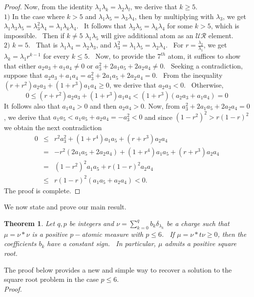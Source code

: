 \documentclass[12pt]{amsart}
\newtheorem{thm}{Theorem}[section]
\begin{document}
\begin{proof}
Now, from the identity $\lambda_1\lambda_k=\lambda_2\lambda_l$, we derive that $k\ge 5$.\\
$1)$ In the case where $k>5$ and  $\lambda_1\lambda_5=\lambda_3\lambda_4$, then by multiplying with $\lambda_3$, we get  
$ \lambda_1\lambda_3\lambda_5=\lambda_3^2\lambda_4=\lambda_1\lambda_k\lambda_4$. \ It follows that  $ \lambda_3\lambda_5=\lambda_k\lambda_4$ for some  $k> 5$, which is impossible. \ Then if $k\ne 5$ $\lambda_1\lambda_5$ will give additional atom as an $\mathcal{UR}$ element. \\
$2)$ $k=5$. \ That is $\lambda_1\lambda_4=\lambda_2\lambda_3$, and
$\lambda_3^2=\lambda_1\lambda_5=\lambda_2\lambda_4$. \ For $r=\frac{\lambda_2}{\lambda_1}$, we get $\lambda_k=\lambda_1r^{k-1}$ for every $k\le 5$. \ Now, to provide the $7^{th}$ atom, it suffices to show that either    $ a_2a_3+a_1a_4\ne 0$ or $a_3^2+2a_1a_5+2a_2a_4\ne 0$. \ Seeking a contradiction, suppose that  $ a_2a_3+a_1a_4=a_3^2+2a_1a_5+2a_2a_4= 0$. \ From the inequality $ (r+r^2)a_2a_3+(1+r^3) a_1a_4\ge 0$, we derive that $a_2a_3<0$. \ Otherwise,
$$ 0\le (r+r^2)a_2a_3+(1+r^3) a_1a_4< (1+r^3)(a_2a_3+ a_1a_4 )= 0$$
It follows also that $a_1a_4>0 $ and then   $a_2a_4>0.$
Now, from 
$a_3^2+2a_1a_5+2a_2a_4=0$, we derive that $a_1a_5<a_1a_5+a_2a_4=-a_3^2<0$ and since 
$(1-r^2)^2>r(1-r)^2$ we obtain the next contradiction
$$\begin{array}{lll} 0 & \le & r^2a_3^2+(1+r^4)a_1a_5+(r+r^3)a_2a_4 \\
&=&-r^2(2a_1a_5+2a_2a_4) +(1+r^4)a_1a_5+(r+r^3)a_2a_4 \\
& = &    (1-r^2)^2a_1a_5+r(1-r)^2a_2a_4 \\
&\le & r(1-r)^2(a_1a_5+a_2a_4) < 0.
\end{array}$$
The proof is complete.
\end{proof}
We now state and prove our main result.
\begin{thm}Let  $q, p$ be integers and $\nu=\sum_{k=0}^q b_k\delta_{\lambda_k}$ be a charge such that $\mu=\nu*\nu$ is a positive $p-$atomic measure with $p\le 6$. \ If $\mu=\nu*t\nu\ge 0$, then the coefficients $ b_k$ have a constant sign. \ In particular, $\mu$ admits a positive square root.
\end{thm}
 The proof below provides a new and simple way to recover a solution to the square root problem in the case $p\le 6$. \\
{\it Proof.} 
\end{document}
